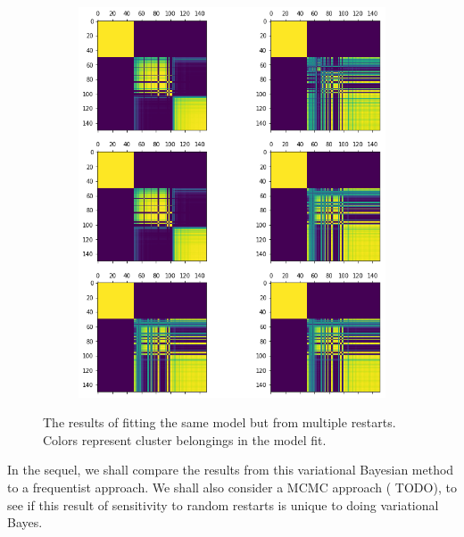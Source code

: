 \documentclass[a4paper]{article}
\begin{document}
\begin{figure}[h!]
\begin{subfigure}[t]{0.39\textwidth}
    \includegraphics[width = \textwidth]{./data_figs/pca_bnp_multiple_clustering_coclust_mat.png}
  \end{subfigure}
	\caption{The results of fitting the same model but from multiple restarts. Colors represent
	cluster belongings in the model fit. }
	\label{fig:pca_bnp_multiple_restarts}
\end{figure}

In the sequel, we shall compare the results from this variational Bayesian method to a
frequentist approach. We shall also consider a MCMC approach ({\color{red} TODO}), to see if this result
of sensitivity to random restarts is unique to doing variational Bayes.
\end{document}
